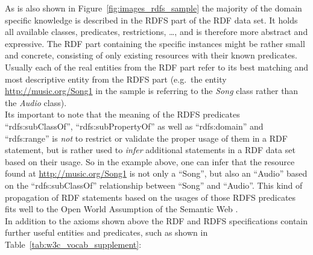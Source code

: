 
As is also shown in Figure~\ref{fig:images_rdfs_sample} the majority of the domain specific knowledge is described in the \gls{RDFS} part of the \gls{RDF} data set. It holds all available classes, predicates, restrictions, \ldots, and is therefore more abstract and expressive. The \gls{RDF} part containing the specific instances might be rather small and concrete, consisting of only existing resources with their known predicates. Usually each of the real entities from the \gls{RDF} part refer to its best matching and most descriptive entity from the \gls{RDFS} part (e.g.\ the entity \url{http://music.org/Song1} in the sample is referring to the \emph{Song} class rather than the \emph{Audio} class). \\

Its important to note that the meaning of the \gls{RDFS} predicates ``rdfs:subClassOf'', ``rdfs:subPropertyOf'' as well as ``rdfs:domain'' and ``rdfs:range'' is \emph{not} to restrict or validate the proper usage of them in a \gls{RDF} statement, but is rather used to \emph{infer} additional statements in a \gls{RDF} data set based on their usage. So in the example above, one can infer that the resource found at \url{http://music.org/Song1} is not only a ``Song'', but also an ``Audio'' based on the ``rdfs:subClassOf'' relationship between ``Song'' and ``Audio''. This kind of propagation of \gls{RDF} statements based on the usages of those \gls{RDFS} predicates fits well to the Open World Assumption of the Semantic Web \citep[pg. 125-152]{allemang2011semantic}. \\

In addition to the axioms shown above the \gls{RDF} and \gls{RDFS} specifications contain further useful entities and predicates, such as shown in Table~\ref{tab:w3c_vocab_supplement}: \@


